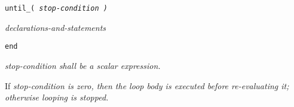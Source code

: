 
\tt{until}\_\s\tt{(} \it{stop-condition} \tt{)}

\s\s\s\s\it{declarations-and-statements}\opt

\tt{end}


\it{stop-condition} shall be a scalar expression.


If \it{stop-condition} is zero, then the loop body is executed
before re-evaluating it; otherwise looping is stopped.

